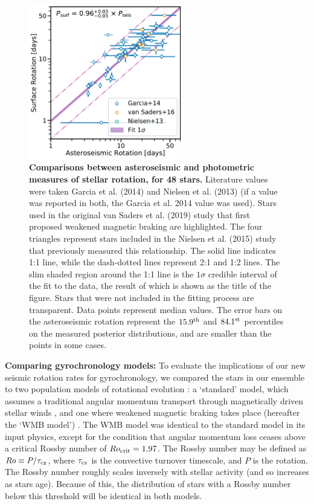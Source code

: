 \documentclass[12pt]{article}
\newcommand{\rtwo}[1]{{#1}}
\begin{document}
\begin{figure}[h!]
	\centering
	\includegraphics[width=0.6\textwidth]{surf-seis-comparison_update_FIg2.pdf}
	\caption{\textbf{Comparisons between asteroseismic and photometric measures of stellar rotation, for 48 stars.} Literature values were taken Garcia et al. (2014) \cite{garcia+2014} and Nielsen et al. (2013) \cite{nielsen+2013} (if a value was reported in both, the Garcia et al. 2014 value was used). Stars used in the original van Saders et al. (2019) \cite{vansaders+2016} study that first proposed weakened magnetic braking are highlighted. The four triangles represent stars included in the Nielsen et al. (2015) study \cite{nielsen+2015} that previously measured this relationship. The solid line indicates 1:1 line, while the dash-dotted lines represent 2:1 and 1:2 lines. The slim shaded region around the 1:1 line is the $1\sigma$ credible interval of the fit to the data, the result of which is shown as the title of the figure. Stars that were not included in the fitting process are transparent. Data points represent median values. The error bars on the asteroseismic rotation represent the $15.9^{\rm th}$ and $84.1^{\rm st}$ percentiles on the measured posterior distributions, and are smaller than the points in some cases.}
	\label{fig:protlit}
\end{figure}

\textbf{Comparing gyrochronology models:} To evaluate the implications of our \rtwo{new seismic rotation rates} for gyrochronology, we compared \rtwo{the stars in our ensemble} to two population models of rotational evolution \cite{vansaders+2019}: a `standard' model, which assumes a traditional angular momentum transport through magnetically driven stellar winds \cite{vansaders+2016,skumanich1972, kawaler1988}, and one where weakened magnetic braking takes place (hereafter the `WMB model') \cite{vansaders+2016}.  The WMB model was identical to the standard model in its input physics, except for the condition that angular momentum loss ceases above a critical Rossby number of $Ro_{\rm crit} = 1.97$. The Rossby number may be defined as $Ro \equiv P/\tau_{\rm cz}$, where $\tau_{\rm cz}$ is the convective turnover timescale, and $P$ is the rotation. The Rossby number roughly scales inversely with stellar activity (and so increases as stars age). \rtwo{Because of this, the distribution of stars with a Rossby number below this threshold will be identical in both models}.
\end{document}

